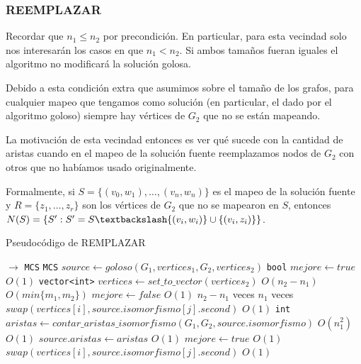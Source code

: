 \subsubsection{REEMPLAZAR}
Recordar que $n_1 \leq n_2$ por precondición. En particular, para esta vecindad solo nos interesarán los casos en que $n_1 < n_2$. Si ambos tamaños fueran iguales el algoritmo no modificará la solución golosa.

Debido a esta condición extra que asumimos sobre el tamaño de los grafos, para cualquier mapeo que tengamos como solución (en particular, el dado por el algoritmo goloso) siempre hay vértices de $G_2$ que no se están mapeando.

La motivación de esta vecindad entonces es ver qué sucede con la cantidad de aristas cuando en el mapeo de la solución fuente reemplazamos nodos de $G_2$ con otros que no habíamos usado originalmente.

Formalmente, si $S = \{(v_0, w_{1}),\hdots , (v_n, w_{n})\}$ es el mapeo de la solución fuente y $R = \{z_1, \hdots, z_r\}$ son los vértices de $G_2$ que no se mapearon en $S$, entonces \\
$N(S) = \{S': S' = S \textbackslash \{(v_i, w_i)\} \cup \{(v_i, z_i)\}\}$. 

\begin{algorithm}[H]
  \small
  \begin{algorithmic}[1]
  \caption{Pseudocódigo de REMPLAZAR}
  \label{algo:5-2}
    $\rightarrow$ \texttt{MCS}
      \State \texttt{MCS} $source \gets goloso(G_1, vertices_1, G_2, vertices_2)$
      \State \texttt{bool} $mejore \gets true$
      \Comment $O(1)$
      \State \texttt{vector<int>} $vertices \gets set\_to\_vector(vertices_2)$
      \Comment $O(n_2-n_1)$
      \Comment $O(min\{m_1, m_2\})$
        \State $mejore \gets false$
        \Comment $O(1)$
        \Comment $n_2-n_1$ veces
          \Comment $n_1$ veces
            \State $swap(vertices[i], source.isomorfismo[j].second)$
            \Comment $O(1)$
            \State \texttt{int} $aristas \gets contar\_aristas\_isomorfismo(G_1, G_2, source.isomorfismo)$
            \Comment $O(n_1^2)$
            \Comment $O(1)$
              \State $source.aristas \gets aristas$  
              \Comment $O(1)$            
              \State $mejore \gets true$
              \Comment $O(1)$
            \Else
              \State $swap(vertices[i], source.isomorfismo[j].second)$
              \Comment $O(1)$
            \EndIf
          \EndFor
        \EndFor
      \EndWhile
    \EndProcedure
  \end{algorithmic}
\end{algorithm}

